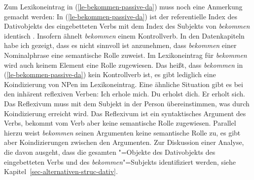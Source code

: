 \noindent
Zum Lexikoneintrag in (\ref{le-bekommen-passive-da}) muss noch eine Anmerkung gemacht werden:
In (\ref{le-bekommen-passive-da}) ist der referentielle Index des Dativobjekts des eingebetteten
Verbs mit dem Index des Subjekts von \emph{bekommen} identisch . Insofern
ähnelt \emph{bekommen} einem Kontrollverb. In den Datenkapiteln habe ich gezeigt,
dass es nicht sinnvoll ist anzunehmen, dass \emph{bekommen} einer Nominalphrase eine
semantische Rolle zuweist. Im Lexikoneintrag für \emph{bekommen} wird auch keinem Element eine
Rolle zugewiesen. Das heißt, dass \emph{bekommen} in (\ref{le-bekommen-passive-da}) kein Kontrollverb ist,
es gibt lediglich eine Koindizierung von NPen im Lexikoneintrag. Eine ähnliche Situation gibt
es bei den inhärent reflexiven Verben:
\eal
\ex Ich erhole mich.
\ex Du erholst dich.
\ex Er erholt sich.
\zl
Das Reflexivum muss mit dem Subjekt in der Person übereinstimmen, was durch Koindizierung erreicht wird.
Das Reflexivum ist ein syntaktisches Argument des Verbs, bekommt vom Verb aber keine semantische Rolle zugewiesen.
Parallel hierzu weist \emph{bekommen} seinen Argumenten keine semantische
Rolle zu, es gibt aber Koindizierungen zwischen den Argumenten. Zur Diskussion einer Analyse,
die davon ausgeht, dass die gesamten "=Objekte des Dativobjekts des eingebetteten Verbs
und des \emph{bekommen}"=Subjekts identifiziert werden, siehe Kapitel~\ref{sec-alternativen-struc-dativ}.


\begin{comment}
The embedding of the dative passive under {\em sein}, which is marginally possible \citep[\page6]{Haider86},
can also be explained:
\eal
\label{ex-ist-zu-bekommen}
\ex[?]{
So   etwas     ist leicht geschenkt zu kriegen.
}
\ex[?]{
So ein Preis ist leicht zugesprochen zu kriegen.
}
\zl
Since the lexical entry of \emph{zu kriegen}, which is parallel to that of \emph{bekommen}
we saw in (\ref{le-bekommen}), is specified to raise the \textsc{acc} value of its verbal complement
\emph{geschenkt} in (\mex{0}a), the modal \sein can raise the object of \emph{geschenkt zu kriegen}
to the subject of the complete verbal complex.
Unfortunately this specification of \accf also allows sentences like (\mex{1}) which
I find unacceptable:
\ea[*]{
In diesem Saal sind viele Preise verliehen bekommen worden.\footnote{
        \citet{Kathol91a} marks this sentences with a question mark.
}
}
\z
(\mex{-1}) and (\mex{0}) can be ruled out by assuming that the dative passive auxiliary
is unakkusativisch as the other passive auxiliaries, \ie, that the \textsc{subj} value and the
\textsc{acc} value of \emph{bekommen} are identical.
\end{comment}




